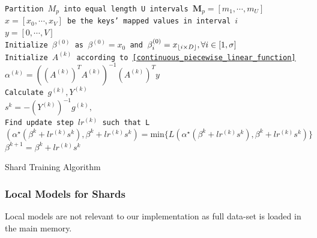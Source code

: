 \begin{algorithm}[H]
    \SetAlgoLined
    \texttt{Partition $M_{p}$ into equal length U intervals $\boldsymbol{M}_p=[m_1,\cdots, m_U]$ }
    {   
        \texttt{$x =[x_0,\cdots, x_V] $ be the keys' mapped values
        in interval $i$} \\
        \texttt{$y =[0,\cdots, V]$ } \\
        \texttt{Initialize $\beta^{(0)}$ as $\beta^{(0)}=x_0$ and $\beta_i^{(0)}=x_{\lfloor i\times D\rfloor}, \forall i\in[1,\sigma]$} \\
        {
            \texttt{Initialize $A^{(k)}$ according to \eqref{continuous_piecewise_linear_function}} \\
            \texttt{$\alpha^{(k)}= ((A^{(k)})^T A^{(k)})^{-1}(A^{(k)})^Ty$} \\
            
            \texttt{Calculate $g^{(k)}, Y^{(k)}$ } \\
            \texttt{$s^{k} = -(Y^{(k)})^{-1} g^{(k)}, $ } \\
            
            \texttt{Find update step $lr^{(k)}$ such that    L$(\alpha^\star(\beta^{k}+ lr^{(k)}s^{k}), \beta^{k}+ lr^{(k)}s^{k}) =\text{min}\{L(\alpha^\star(\beta^{k}+ lr^{(k)}s^{k}), \beta^{k}+ lr^{(k)}s^{k})\} $} \\
            
            \texttt{$\beta^{k+1} = \beta^{k}+ lr^{(k)}s^{k}$ } \\
        }
    }
    
    \caption{Shard Training Algorithm}
    \label{Shard_Training_LISA}
\end{algorithm}

\subsubsection{Local Models for Shards}
Local models are not relevant to our implementation as full data-set is loaded in the main memory.  
